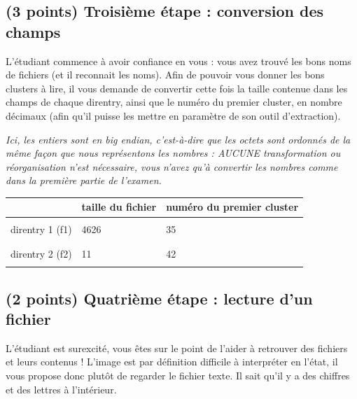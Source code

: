 \documentclass[11pt,a4paper]{article}
\begin{document}

\newpage

\subsection{(3 points) Troisième étape : conversion des champs }

L'étudiant commence à avoir confiance en vous : vous avez trouvé les bons noms de fichiers (et il reconnait les noms).
Afin de pouvoir vous donner les bons clusters à lire, il vous demande de convertir cette fois la taille contenue dans les champs de chaque direntry, ainsi que le numéro du premier cluster, en nombre décimaux (afin qu'il puisse les mettre en paramètre de son outil d'extraction).

\smallskip

\textit{Ici, les entiers sont en big endian, c'est-à-dire que les octets sont ordonnés de la même façon que nous représentons les nombres : AUCUNE transformation ou réorganisation n'est nécessaire, vous n'avez qu'à convertir les nombres comme dans la première partie de l'examen.}

\smallskip

\begin{center}
\begin{tabular}{ | c | C{5cm} | C{7.5cm} | }
\hline
 & taille du fichier & numéro du premier cluster \\
\hline
 & & \\
direntry 1 (f1) & 4626 & 35 \\
 & & \\
\hline
 & & \\
direntry 2 (f2) & 11 & 42 \\
 & & \\
\hline
\end{tabular}
\end{center}

\smallskip

\subsection{(2 points) Quatrième étape : lecture d'un fichier }

L'étudiant est surexcité, vous êtes sur le point de l'aider à retrouver des fichiers et leurs contenus !
L'image est par définition difficile à interpréter en l'état, il vous propose donc plutôt de regarder le fichier texte.
Il sait qu'il y a des chiffres et des lettres à l'intérieur.
\end{document}
